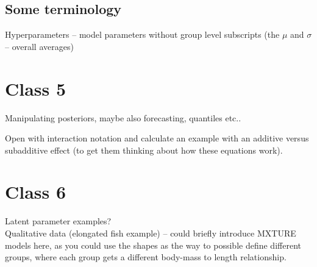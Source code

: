 \documentclass[11pt]{article}
\begin{document}
\subsection{Some terminology} %
Hyperparameters -- model parameters without group level subscripts (the $\mu$ and $\sigma$ -- overall averages)


\newpage
\section{Class 5} 

Manipulating posteriors, maybe also forecasting, quantiles etc..

Open with interaction notation and calculate an example with an additive versus subadditive effect (to get them thinking about how these equations work). 

\newpage
\section{Class 6} 

Latent parameter examples?\\
Qualitative data (elongated fish example) -- could briefly introduce MXTURE models here, as you could use the shapes as the way to possible define different groups, where each group gets a different body-mass to length relationship. 
\end{document}

